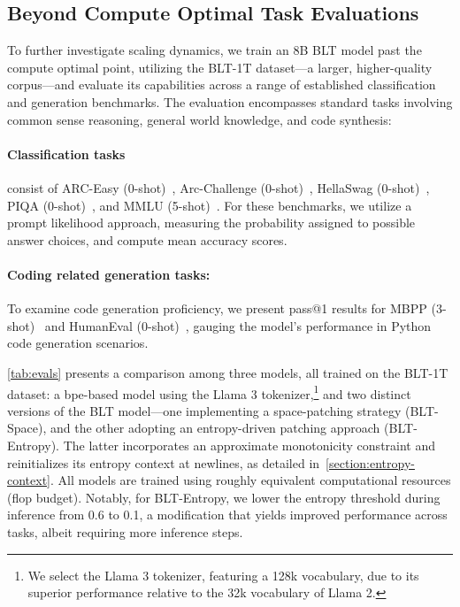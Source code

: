 \subsection{Beyond Compute Optimal Task Evaluations}
\label{section:evals}
To further investigate scaling dynamics, we train an 8B {\textsc BLT} model past the compute optimal point, utilizing the {\textsc BLT}-1T dataset—a larger, higher-quality corpus—and evaluate its capabilities across a range of established classification and generation benchmarks. The evaluation encompasses standard tasks involving common sense reasoning, general world knowledge, and code synthesis:
\paragraph{Classification tasks} consist of ARC-Easy (0-shot)~\citep{Eval_ARC}, Arc-Challenge (0-shot)~\citep{Eval_ARC}, HellaSwag (0-shot)~\citep{Eval_hellaswag}, PIQA (0-shot)~\citep{Eval_piqa}, and MMLU (5-shot)~\citep{hendrycks2020measuring}. For these benchmarks, we utilize a prompt likelihood approach, measuring the probability assigned to possible answer choices, and compute mean accuracy scores.
\paragraph{Coding related generation tasks:} To examine code generation proficiency, we present pass@1 results for MBPP (3-shot)~\citep{Eval_MBPP} and HumanEval (0-shot)~\citep{Eval_HumanEval}, gauging the model’s performance in Python code generation scenarios.

\autoref{tab:evals} presents a comparison among three models, all trained on the {\textsc BLT}-1T dataset: a bpe-based model using the Llama 3 tokenizer,\footnote{We select the Llama 3 tokenizer, featuring a 128k vocabulary, due to its superior performance relative to the 32k vocabulary of Llama 2.} and two distinct versions of the {\textsc BLT} model—one implementing a space-patching strategy ({\textsc BLT}-Space), and the other adopting an entropy-driven patching approach ({\textsc BLT}-Entropy). The latter incorporates an approximate monotonicity constraint and reinitializes its entropy context at newlines, as detailed in~\autoref{section:entropy-context}. All models are trained using roughly equivalent computational resources (flop budget). Notably, for {\textsc BLT}-Entropy, we lower the entropy threshold during inference from 0.6 to 0.1, a modification that yields improved performance across tasks, albeit requiring more inference steps.

